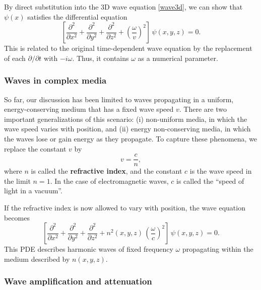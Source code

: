 \documentclass[10pt,a4paper]{article}
\begin{document}
By direct substitution into the 3D wave equation \eqref{wave3d}, we
can show that $\psi(x)$ satisfies the differential equation
\begin{equation}
\left[\frac{\partial^2}{\partial x^2} + \frac{\partial^2}{\partial y^2} + \frac{\partial^2}{\partial z^2} + \left(\frac{\omega}{v}\right)^2\right] \, \psi(x,y,z) = 0.
\end{equation}
This is related to the original time-dependent wave equation by the
replacement of each $\partial/\partial t$ with $-i\omega$. Thus, it
contains $\omega$ as a numerical parameter.

    \hypertarget{waves-in-complex-media}{%
\subsubsection{Waves in complex media}\label{waves-in-complex-media}}

So far, our discussion has been limited to waves propagating in a
uniform, energy-conserving medium that has a fixed wave speed $v$.
There are two important generalizations of this scenario: (i)
non-uniform media, in which the wave speed varies with position, and
(ii) energy non-conserving media, in which the waves lose or gain energy
as they propagate. To capture these phenomena, we replace the constant
$v$ by
\begin{equation}
v = \frac{c}{n},
\end{equation}
where $n$ is called the \textbf{refractive index}, and the constant
$c$ is the wave speed in the limit $n = 1$. In the case of
electromagnetic waves, $c$ is called the ``speed of light in a
vacuum''.

If the refractive index is now allowed to vary with position, the wave
equation becomes
\begin{equation}
\left[\frac{\partial^2}{\partial x^2} + \frac{\partial^2}{\partial y^2} + \frac{\partial^2}{\partial z^2} + n^2(x,y,z)\, \left(\frac{\omega}{c}\right)^2\right] \, \psi(x,y,z) = 0.
\end{equation}
This PDE describes harmonic waves of fixed frequency $\omega$
propagating within the medium described by $n(x,y,z)$.

\subsubsection{Wave amplification and attenuation}
\label{wave-amplification-and-attenuation}
\end{document}
